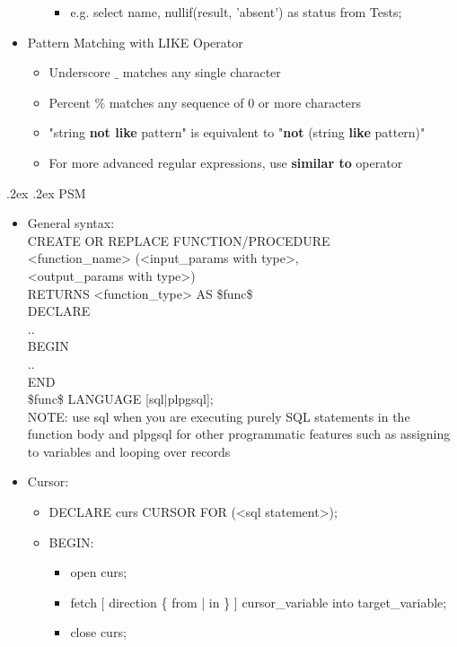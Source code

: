 \documentclass[10pt,landscape,a4paper]{scrartcl}
\makeatletter
\renewcommand{\section}{\@startsection{section}{1}{0mm}%
  {.2ex}%
  {.2ex}%
{\color{myblue}\sffamily\small\bfseries}}
\makeatother
\begin{document}
\begin{multicols*}{4}
\begin{itemize}
\begin{itemize}
\begin{itemize}
            \item e.g. select name, nullif(result, 'absent') as status from Tests;
          \end{itemize}
      \end{itemize}
      \item Pattern Matching with LIKE Operator
      \begin{itemize}
          \item Underscore $\_$ matches any single character
          \item Percent $\%$ matches any sequence of 0 or more characters
          \item "string \textbf{not like} pattern" is equivalent to "\textbf{not} (string \textbf{like} pattern)"
          \item For more advanced regular expressions, use \textbf{similar to} operator
      \end{itemize}
  \end{itemize}
  \section{PSM}
    \begin{itemize}
      \item General syntax: \\
         CREATE OR REPLACE FUNCTION/PROCEDURE \\ <function\_name> (<input\_params with type>, \\
         <output\_params with type>) \\
         RETURNS <function\_type> AS \$func\$ \\
         DECLARE \\
         .. \\
         BEGIN \\
         .. \\
         END \\
         \$func\$ LANGUAGE [sql|plpgsql]; \\
     NOTE: use sql when you are executing purely SQL statements in the function body and plpgsql for other programmatic features such as assigning to variables and looping over records
     \item Cursor:
       \begin{itemize}
       \item DECLARE curs CURSOR FOR (<sql statement>);
       \item BEGIN:
         \begin{itemize}
              \item open curs;
              \item fetch [ direction \{ from | in \} ] cursor\_variable into target\_variable;
              \item close curs;
         \end{itemize}
      \end{itemize}
   \end{itemize}

\end{multicols*}
\end{document}
